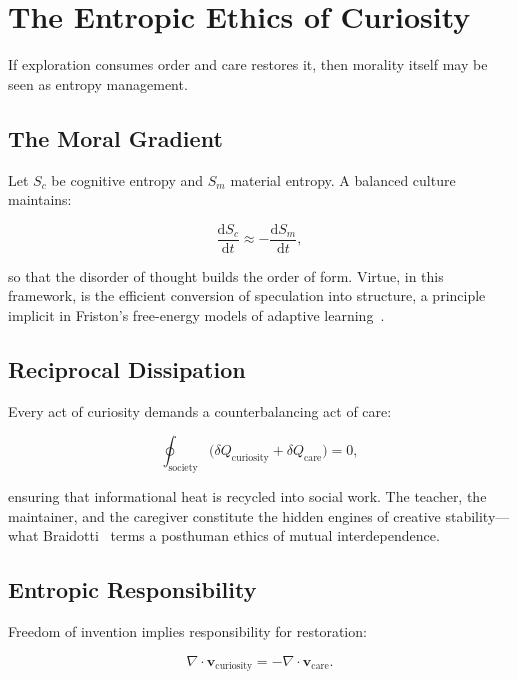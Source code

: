 \documentclass[12pt,a4paper]{article}
\theoremstyle{definition}
\newcommand{\ddt}[1]{\frac{\mathrm{d}#1}{\mathrm{d}t}}
\begin{document}
\section{The Entropic Ethics of Curiosity}

If exploration consumes order and care restores it, then morality itself may be
seen as entropy management.

\subsection{The Moral Gradient}

Let $S_c$ be cognitive entropy and $S_m$ material entropy.  A balanced culture
maintains:

\begin{equation}
  \ddt{S_c} \approx -\ddt{S_m},
\end{equation}

so that the disorder of thought builds the order of form.  Virtue, in this
framework, is the efficient conversion of speculation into structure, a
principle implicit in Friston's free-energy models of adaptive
learning~\citep{friston2023}.

\subsection{Reciprocal Dissipation}

Every act of curiosity demands a counterbalancing act of care:

\begin{equation}
  \oint_{\mathrm{society}} \bigl(\delta Q_{\mathrm{curiosity}}
  + \delta Q_{\mathrm{care}}\bigr) = 0,
  \label{eq:reciprocal}
\end{equation}

ensuring that informational heat is recycled into social work.  The teacher, the
maintainer, and the caregiver constitute the hidden engines of creative
stability---what Braidotti~\citeyearpar{braidotti2017} terms a posthuman ethics
of mutual interdependence.

\subsection{Entropic Responsibility}

Freedom of invention implies responsibility for restoration:

\begin{equation}
  \nabla \cdot \mathbf{v}_{\mathrm{curiosity}}
  = -\nabla \cdot \mathbf{v}_{\mathrm{care}}.
\end{equation}
\end{document}
